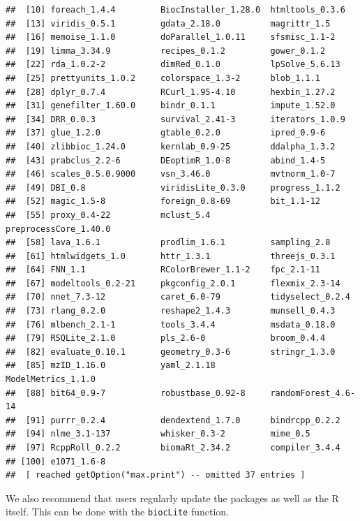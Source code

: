 \begin{knitrout}
\begin{kframe}
\begin{verbatim}
##  [10] foreach_1.4.4         BiocInstaller_1.28.0  htmltools_0.3.6      
##  [13] viridis_0.5.1         gdata_2.18.0          magrittr_1.5         
##  [16] memoise_1.1.0         doParallel_1.0.11     sfsmisc_1.1-2        
##  [19] limma_3.34.9          recipes_0.1.2         gower_0.1.2          
##  [22] rda_1.0.2-2           dimRed_0.1.0          lpSolve_5.6.13       
##  [25] prettyunits_1.0.2     colorspace_1.3-2      blob_1.1.1           
##  [28] dplyr_0.7.4           RCurl_1.95-4.10       hexbin_1.27.2        
##  [31] genefilter_1.60.0     bindr_0.1.1           impute_1.52.0        
##  [34] DRR_0.0.3             survival_2.41-3       iterators_1.0.9      
##  [37] glue_1.2.0            gtable_0.2.0          ipred_0.9-6          
##  [40] zlibbioc_1.24.0       kernlab_0.9-25        ddalpha_1.3.2        
##  [43] prabclus_2.2-6        DEoptimR_1.0-8        abind_1.4-5          
##  [46] scales_0.5.0.9000     vsn_3.46.0            mvtnorm_1.0-7        
##  [49] DBI_0.8               viridisLite_0.3.0     progress_1.1.2       
##  [52] magic_1.5-8           foreign_0.8-69        bit_1.1-12           
##  [55] proxy_0.4-22          mclust_5.4            preprocessCore_1.40.0
##  [58] lava_1.6.1            prodlim_1.6.1         sampling_2.8         
##  [61] htmlwidgets_1.0       httr_1.3.1            threejs_0.3.1        
##  [64] FNN_1.1               RColorBrewer_1.1-2    fpc_2.1-11           
##  [67] modeltools_0.2-21     pkgconfig_2.0.1       flexmix_2.3-14       
##  [70] nnet_7.3-12           caret_6.0-79          tidyselect_0.2.4     
##  [73] rlang_0.2.0           reshape2_1.4.3        munsell_0.4.3        
##  [76] mlbench_2.1-1         tools_3.4.4           msdata_0.18.0        
##  [79] RSQLite_2.1.0         pls_2.6-0             broom_0.4.4          
##  [82] evaluate_0.10.1       geometry_0.3-6        stringr_1.3.0        
##  [85] mzID_1.16.0           yaml_2.1.18           ModelMetrics_1.1.0   
##  [88] bit64_0.9-7           robustbase_0.92-8     randomForest_4.6-14  
##  [91] purrr_0.2.4           dendextend_1.7.0      bindrcpp_0.2.2       
##  [94] nlme_3.1-137          whisker_0.3-2         mime_0.5             
##  [97] RcppRoll_0.2.2        biomaRt_2.34.2        compiler_3.4.4       
## [100] e1071_1.6-8          
##  [ reached getOption("max.print") -- omitted 37 entries ]
\end{verbatim}
\end{kframe}
\end{knitrout}

We also recommend that users regularly update the packages as well as
the R itself. This can be done with the \texttt{biocLite} function.

